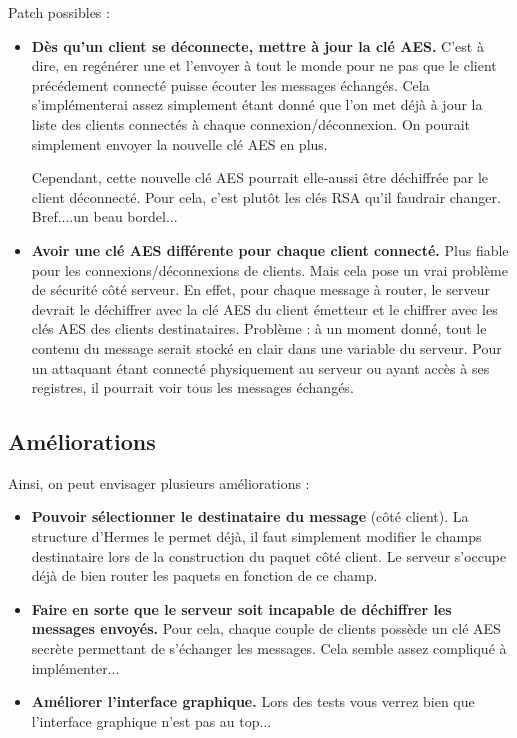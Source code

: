 \documentclass{article}
\begin{document}
\vspace{0.5cm}

Patch possibles : 
\begin{itemize}
    \item \textbf{Dès qu'un client se déconnecte, mettre à jour la clé AES.} C'est à dire, en regénérer une et l'envoyer à tout le monde 
    pour ne pas que le client précédement connecté puisse écouter les messages échangés. Cela s'implémenterai assez simplement 
    étant donné que l'on met déjà à jour la liste des clients connectés à chaque connexion/déconnexion. On pourait simplement envoyer 
    la nouvelle clé AES en plus. 

    Cependant, cette nouvelle clé AES pourrait elle-aussi être déchiffrée par le client déconnecté. Pour cela, c'est plutôt les clés RSA 
    qu'il faudrair changer. Bref....un beau bordel... 
    \item \textbf{Avoir une clé AES différente pour chaque client connecté.} Plus fiable pour les connexions/déconnexions de clients. 
    Mais cela pose un vrai problème de sécurité côté serveur. En effet, pour chaque message à router, le serveur devrait le déchiffrer 
    avec la clé AES du client émetteur et le chiffrer avec les clés AES des clients destinataires. Problème : à un moment donné, 
    tout le contenu du message serait stocké en clair dans une variable du serveur. Pour un attaquant étant connecté physiquement au serveur 
    ou ayant accès à ses registres, il pourrait voir tous les messages échangés. 
\end{itemize}

\subsection{Améliorations}

Ainsi, on peut envisager plusieurs améliorations :
\begin{itemize}
    \item \textbf{Pouvoir sélectionner le destinataire du message} (côté client).
    La structure d'Hermes le permet déjà, il faut simplement modifier le champs destinataire lors de la construction du 
    paquet côté client. Le serveur s'occupe déjà de bien router les paquets en fonction de ce champ. 
    \item \textbf{Faire en sorte que le serveur soit incapable de déchiffrer les messages envoyés.} 
    Pour cela, chaque couple de clients possède un clé AES secrète permettant de s'échanger les messages. 
    Cela semble assez compliqué à implémenter... 
    \item \textbf{Améliorer l'interface graphique.} 
    Lors des tests vous verrez bien que l'interface graphique n'est pas au top... 
\end{itemize}
\end{document}
